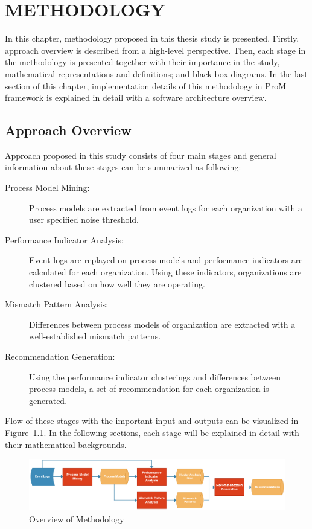 \chapter{METHODOLOGY}
\label{chp:methodology}

In this chapter, methodology proposed in this thesis study is presented. Firstly, approach overview is described from a high-level perspective. Then, each stage in the methodology is presented together with their importance in the study, mathematical representations and definitions; and black-box diagrams. In the last section of this chapter, implementation details of this methodology in ProM framework is explained in detail with a software architecture overview.

\section{Approach Overview}
\label{sec:approach-overview}
Approach proposed in this study consists of four main stages and general information about these stages can be summarized as following:
\begin{description}
	\item[Process Model Mining:] Process models are extracted from event logs for each organization with a user specified noise threshold.
	\item[Performance Indicator Analysis:] Event logs are replayed on process models and performance indicators are calculated for each organization. Using these indicators, organizations are clustered based on how well they are operating.
	\item[Mismatch Pattern Analysis:] Differences between process models of organization are extracted with a well-established mismatch patterns.
	\item[Recommendation Generation:] Using the performance indicator clusterings and differences between process models, a set of recommendation for each organization is generated.
\end{description}

Flow of these stages with the important input and outputs can be visualized in Figure~\ref{fig:approach-overview}. In the following sections, each stage will be explained in detail with their mathematical backgrounds.
\begin{figure}
  \centering
  \includegraphics[width=\textwidth]{4_methodology/approach-overview}
  \caption{Overview of Methodology}
  \label{fig:approach-overview}
\end{figure}

